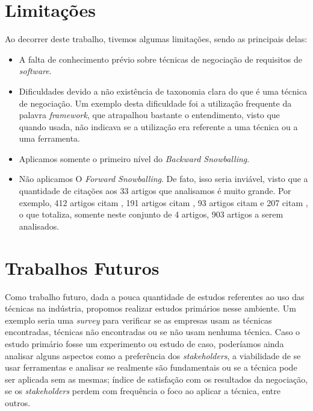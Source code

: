 \section{Limitações}

Ao decorrer deste trabalho, tivemos algumas limitações, sendo as principais delas:
\begin{itemize}
\setlength{\itemsep}{1pt}
\setlength{\itemindent}{20pt}
\item A falta de conhecimento prévio sobre técnicas de negociação de requisitos de \textit{software}.
\item Dificuldades devido a não existência de taxonomia clara do que é uma técnica de negociação. Um exemplo desta dificuldade foi a utilização frequente da palavra \textit{framework}, que atrapalhou bastante o entendimento, visto que quando usada, não indicava se a utilização era referente a uma técnica ou a uma ferramenta.
\item Aplicamos somente o primeiro nível do \textit{Backward Snowballing}.
\item Não aplicamos O \textit{Forward Snowballing}. De fato, isso seria
inviável, visto que a quantidade de citações aos 33 artigos que analisamos é muito grande. Por exemplo, 412 artigos citam \cite{boehm1998using}, 191 artigos citam \cite{boehm1994software}, 93 artigos citam \cite{grunbacher2001surfacing} e 207 citam \cite{boehm1995software}, o que totaliza, somente neste conjunto de 4 artigos, 903 artigos a serem analisados.
\end{itemize} 

\section{Trabalhos Futuros}

Como trabalho futuro, dada a pouca quantidade de estudos referentes ao uso das
técnicas na indústria, propomos realizar estudos primários nesse ambiente. Um
exemplo seria uma \textit{survey} para verificar se as empresas usam as técnicas
encontradas, técnicas não encontradas ou se não usam nenhuma técnica. Caso o
estudo primário fosse um experimento ou estudo de caso, poderíamos ainda analisar alguns aspectos como a preferência dos \textit{stakeholders}, a viabilidade de se usar ferramentas e analisar se realmente são fundamentais ou se a técnica pode ser aplicada sem as mesmas; índice de satisfação com os resultados da negociação, se os \textit{stakeholders} perdem com frequência o foco ao aplicar a técnica, entre outros.
